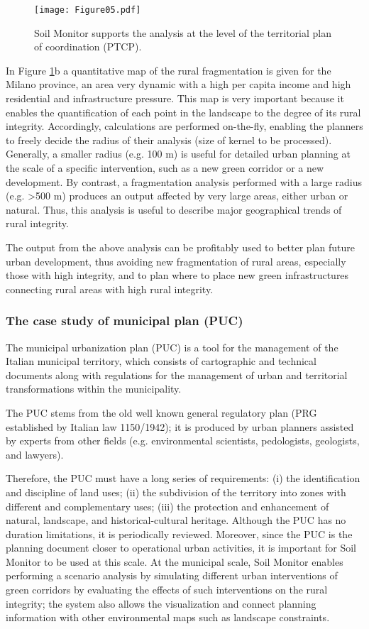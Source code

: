 \documentclass[APA,LATO1COL,doublespace]{WileyNJD-v2}
\begin{document}
\begin{figure}[t]
    \centerline{\texttt{[image: Figure05.pdf]}}
    \caption{ Soil Monitor supports the analysis at the level of the territorial plan of coordination (PTCP). } \label{fig:casePROV}
\end{figure}

In Figure \ref{fig:casePROV}b a quantitative map of the rural fragmentation is given for the Milano province, an area very dynamic with a high per capita income and high residential and infrastructure pressure. 
This map is very important because it enables the quantification of each point in the landscape to the degree of its rural integrity. 
Accordingly, calculations are performed on-the-fly, enabling the planners to freely decide the radius of their analysis (size of kernel to be processed).
Generally, a smaller radius (e.g. 100 m) is useful for detailed urban planning at the scale of a specific intervention, such as a new green corridor or a new development.
By contrast, a fragmentation analysis performed with a large radius (e.g. >500 m) produces an output affected by very large areas, either urban or natural. 
Thus, this analysis is useful to describe major geographical trends of rural integrity.

The output from the above analysis can be profitably used to better plan future urban development, thus avoiding new fragmentation of rural areas, especially those with high integrity, and to plan where to place new green infrastructures connecting rural areas with high rural integrity.

\subsubsection{The case study of municipal plan (PUC)}
The municipal urbanization plan (PUC) is a tool for the management of the Italian municipal territory, which consists of cartographic and technical documents along with regulations for the management of urban and territorial transformations within the municipality.

The PUC stems from the old well known general regulatory plan (PRG established by Italian law 1150/1942); it is produced by urban planners assisted by experts from other fields (e.g. environmental scientists, pedologists, geologists, and lawyers).

Therefore, the PUC must have a long series of requirements: (i) the identification and discipline of land uses; (ii) the subdivision of the territory into zones with different and complementary uses; (iii) the protection and enhancement of natural, landscape, and historical-cultural heritage. 
Although the PUC has no duration limitations, it is periodically reviewed.
Moreover, since the PUC is the planning document closer to operational urban activities, it is important for Soil Monitor to be used at this scale. 
At the municipal scale, Soil Monitor enables performing a scenario analysis by simulating different urban interventions of green corridors by evaluating the effects of such interventions on the rural integrity; the system also allows the visualization and connect planning information with other environmental maps such as landscape constraints.
\end{document}
